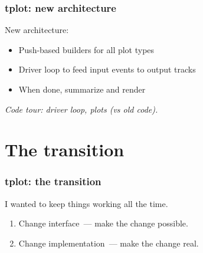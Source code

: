 \documentclass{beamer}
\begin{document}

\begin{frame}
  \frametitle{tplot: new architecture}
  New architecture:
  \begin{itemize}
    \item Push-based builders for all plot types
    \item Driver loop to feed input events to output tracks
    \item When done, summarize and render
  \end{itemize}
  \emph{Code tour: driver loop, plots (vs old code).}
\end{frame}

\section{The transition}

\begin{frame}
  \frametitle{tplot: the transition}
  I wanted to keep things working all the time.

  \begin{enumerate}
    \item Change interface~--- make the change possible.
    \item Change implementation~--- make the change real.
  \end{enumerate}
\end{frame}
\end{document}
